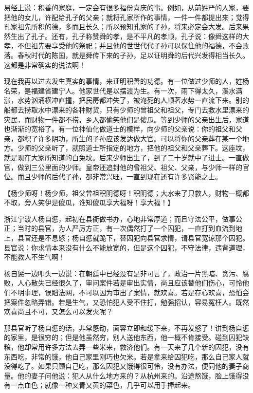 \documentclass[12pt,twoside,openany]{book}
\newcommand{\kai}[1]{{\CJKfamily{kai}#1}}
\begin{document}
易经上说：积善的家庭，一定会有很多福份喜庆的事。例如，从前姓严的人家，要把他的女儿，许配给孔子的父亲；就将孔家所作的事情，一件一件都提出来；觉得孔家祖先所积的德，多而且长久；所以预知孔家的子孙，将来必定会大发。后来果然生出了孔子。还有，孔子称赞舜的孝，是不平凡的孝顺，孔子说：像舜这样的大孝，不但祖先要享受他的祭祀；并且他的世世代代子孙可以保住他的福德，不会败落。春秋时代的陈国，就是舜传下来的子孙，足以证明舜的后代兴发得相当长久。这都是非常确实的说法啊！

现在我再以过去发生真实的事情，来证明积善的功德。有一位做过少师的人，姓杨名荣，是福建省建宁人。他家世代是以摆渡为生。有一次，雨下得太久，溪水满涨，水势汹涌横冲直撞，把民房都冲失了，被淹死的人顺著水势一直流下来。别的船都去捞取水中漂来的各种财货，只有少师的曾祖父和祖父，专门去救水里漂来的灾民，而财物一件都不捞，乡人都偷笑他们是傻瓜。等到少师的父亲出生后，家道也渐渐的宽裕了。有一位神仙化做道士的模样，向少师的父亲说：你的祖父和父亲，都积了许多阴功，所生的子孙应该发达做大官。可以将你的父亲葬在某一个地方。少师的父亲听了，就照道士所指定的地方，把他的祖父和父亲葬下。这座坟，就是现在大家所知道的白兔坟。后来少师出生了，到了二十岁就中了进士。一直做官，做到三公里面的少师。皇帝还追封他的曾祖父、祖父、父亲，与少师一样的官位。而且少师的后代子孙，都非常兴旺，一直到现在还有许多贤能之士。

【\kai{杨少师呀！杨少师，祖父曾祖积阴德呀！积阴德；大水来了只救人，财物一概都不取，旁人笑伊是傻瓜，谁知傻瓜享大福呀！享大福！}】

浙江宁波人杨自惩，起初在县衙做书办，心地非常厚道；而且守法公平，做事公正；当时的县官，为人严厉方正，有一次偶然打了一个囚犯，一直打到血流到地上，县官还是不息怒；杨自惩就跪下，替囚犯向县官求情，请县官宽谅那个囚犯。县官说：你求情本来没有什么不能放宽的，但是这个囚犯，不守法律，违背道理，不能教人不生气啊！

杨自惩一边叩头一边说：在朝廷中已经没有是非可言了，政治一片黑暗、贪污、腐败，人心散失已经很久了，审问案件若是审出实情，尚且应该替他们伤心，可怜他们不明事理，误蹈法网，不可以因为审出了案情，就欢喜。若是存心欢喜，恐怕会把案件忽略弄错。若是生气，又恐怕犯人受不住打，勉强招认，容易冤枉人。既然欢喜尚且不可，又怎么可以发火呢？

那县官听了杨自惩的话，非常感动，面容立即和缓下来，不再发怒了！讲到杨自惩的家里，是很穷的；但是他虽然穷，别人送他东西，他一概不肯接受。碰到囚犯缺粮，他却常用许多方法去弄一些米来，救济他们。有一天来了几个新的囚犯，没有东西吃，非常的饿，他自己家里刚巧也欠米。若是拿来给囚犯吃，那么自己家人就没得吃了。如果只顾自己吃，那么囚犯又饿得很可怜，没有办法，便同他的妻子商量。他的妻子问他说：犯人从什么地方来的？从杭州来的。沿途熬饿，脸上饿得没有一点血色；就像一种又青又黄的菜色，几乎可以用手捧起来。
\end{document}
